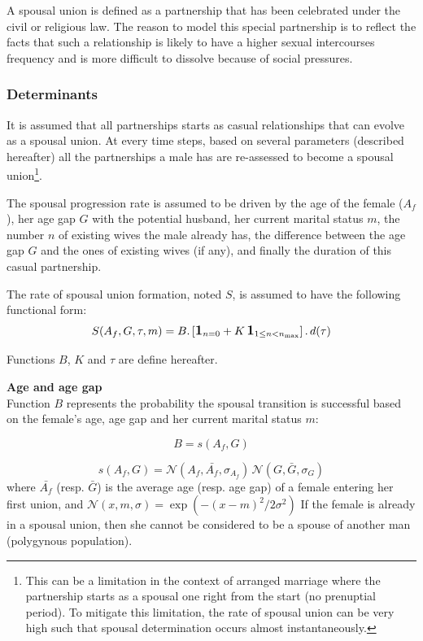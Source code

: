 \documentclass[11pt, onecolumn]{article}
\newcommand{\one}[1]{\textbf{\large{1}}_{#1}}
\begin{document}
A spousal union is defined as a partnership that has been celebrated under the civil or religious law. The reason to model this special partnership is to reflect the facts that such a relationship is likely to have a higher sexual intercourses frequency and is more difficult to dissolve because of social pressures.

\subsubsection{Determinants}

It is assumed that all partnerships starts as casual relationships that can evolve as a spousal union. At every time steps, based on several parameters (described hereafter) all the partnerships a male has are re-assessed to become a spousal union\footnote{This can be a limitation in the context of arranged marriage where the partnership starts as a spousal one right from the start (no prenuptial period). To mitigate this limitation, the rate of spousal union can be very high such that spousal determination occurs almost instantaneously.}.

The spousal progression rate is assumed to be driven by the age of the female ($A_f$), her age gap $G$ with the potential husband, her current marital status $m$, the number $n$ of existing wives the male already has, the difference between the age gap $G$ and the ones of existing wives (if any), and finally the duration of this casual partnership.

The rate of spousal union formation, noted $S$, is assumed to have the following functional form:
\begin{equation}
\label{eqSpouse}
S(A_f,G,\tau,m) = B . \left[\one{n=0} +  K\,\one{1\leq n <n_{\mathrm{max}}} \right] .\, d(\tau)
\end{equation}

Functions $B$, $K$ and $\tau$ are define hereafter.

\textbf{Age and age gap}\\
Function $B$ represents the probability the spousal transition is successful based on the female's age, age gap and her current marital status $m$:

$$B = s(A_f,G)$$

$$ s(A_f,G) = \mathcal{N}(A_f,\bar{A_f},\sigma_{A_f})\, \mathcal{N}(G,\bar{G},\sigma_{G}) $$
where $\bar{A_f}$ (resp. $\bar{G}$) is the average age (resp. age gap) of a female entering her first union,  and $\mathcal{N}(x,m,\sigma)=\exp(-(x-m)^2/2\sigma^2)$ 
 If the female is already in a spousal union, then she cannot be considered to be a spouse of another man (polygynous population).
\end{document}
